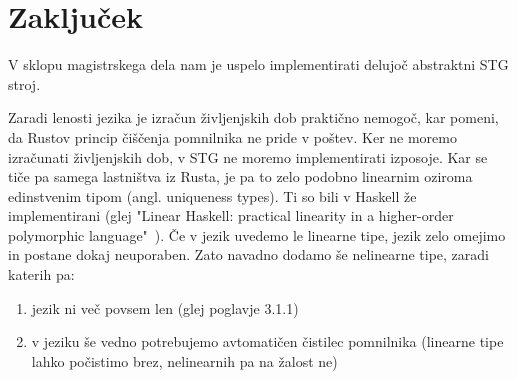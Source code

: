 %

\chapter{Zaključek}
\label{ch:zakljucek}

V sklopu magistrskega dela nam je uspelo implementirati delujoč abstraktni STG stroj.

Zaradi lenosti jezika je izračun življenjskih dob praktično nemogoč, kar pomeni, da Rustov princip čiščenja pomnilnika ne pride v poštev. Ker ne moremo izračunati življenjskih dob, v STG ne moremo implementirati izposoje. Kar se tiče pa samega lastništva iz Rusta, je pa to zelo podobno linearnim oziroma edinstvenim tipom (angl. uniqueness types). Ti so bili v Haskell že implementirani (glej "Linear Haskell: practical linearity in a higher-order polymorphic language"~\cite{bernardy2018linear}). Če v jezik uvedemo le linearne tipe, jezik zelo omejimo in postane dokaj neuporaben. Zato navadno dodamo še nelinearne tipe, zaradi katerih pa:

\begin{enumerate}
    \item jezik ni več povsem len (glej poglavje 3.1.1)
    \item v jeziku še vedno potrebujemo avtomatičen čistilec pomnilnika (linearne tipe lahko počistimo brez, nelinearnih pa na žalost ne)
\end{enumerate}